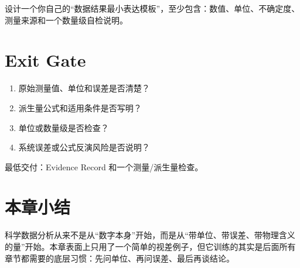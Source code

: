 \begin{exercisebox}[开放练习]
设计一个你自己的“数据结果最小表达模板”，至少包含：数值、单位、不确定度、测量来源和一个数量级自检说明。
\end{exercisebox}

\section{Exit Gate}

\begin{enumerate}
    \item 原始测量值、单位和误差是否清楚？
    \item 派生量公式和适用条件是否写明？
    \item 单位或数量级是否检查？
    \item 系统误差或公式反演风险是否说明？
\end{enumerate}

最低交付：Evidence Record 和一个测量/派生量检查。

\section{本章小结}

科学数据分析从来不是从“数字本身”开始，而是从“带单位、带误差、带物理含义的量”开始。本章表面上只用了一个简单的视差例子，但它训练的其实是后面所有章节都需要的底层习惯：先问单位、再问误差、最后再谈结论。
